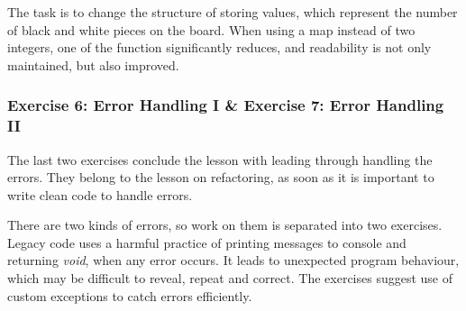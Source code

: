     The task is to change the structure of storing values, which represent the number of black and white pieces on the board. When using a map instead of two integers, one of the function significantly reduces, and readability is not only maintained, but also improved.
    
    \subsubsection{Exercise 6: Error Handling I \& Exercise 7: Error Handling II}
    The last two exercises conclude the lesson with leading through handling the errors. They belong to the lesson on refactoring, as soon as it is important to write clean code to handle errors.
    
    There are two kinds of errors, so work on them is separated into two exercises. Legacy code uses a harmful practice of printing messages to console and returning \textit{void}, when any error occurs. It leads to unexpected program behaviour, which may be difficult to reveal, repeat and correct. The exercises suggest use of custom exceptions to catch errors efficiently.
